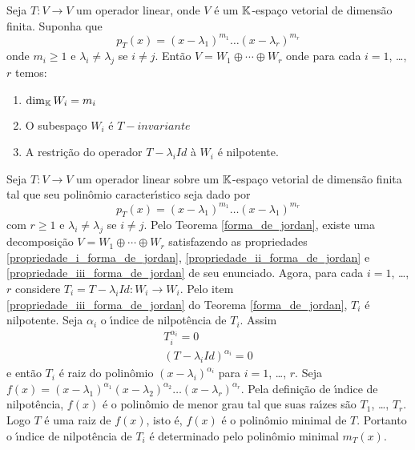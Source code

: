 \begin{teorema}\label{forma_de_jordan}
    Seja $T : V \to V$ um operador linear, onde $V$ \'e um $\mathbb{K}$-espa\c{c}o vetorial de dimens\~ao finita. Suponha que
    \[
        p_T(x) = (x - \lambda_1)^{m_1}\dots(x - \lambda_r)^{m_r}
    \]
    onde $m_i \ge 1$ e $\lambda_i \ne \lambda_j$ se $i \ne j$. Ent\~ao $V = W_1 \oplus \cdots \oplus W_r$ onde para cada $i = 1$, \dots, $r$ temos:
    \begin{enumerate}[label=({\roman*})]
        \item\label{propriedade_i_forma_de_jordan} $\dim_{\mathbb{K}} W_i = m_i$
        \item\label{propriedade_ii_forma_de_jordan} O subespa\c{c}o $W_i$ \'e $T-invariante$
        \item\label{propriedade_iii_forma_de_jordan} A restri\c{c}\~ao do operador $T - \lambda_i Id$ \`a $W_i$ \'e nilpotente.
    \end{enumerate}
\end{teorema}

Seja $T : V \to V$ um operador linear sobre um $\mathbb{K}$-espa\c{c}o vetorial de dimens\~ao finita tal que seu polin\^omio caracter{\'\i}stico seja dado por
\[
    p_T(x) = (x - \lambda_1)^{m_1}\dots(x - \lambda_1)^{m_r}
\]
com $r \ge 1$ e $\lambda_i \ne \lambda_j$ se $i \ne j$. Pelo Teorema \ref{forma_de_jordan}, existe uma decomposi\c{c}\~ao $V = W_1 \oplus \cdots \oplus W_r$ satisfazendo as propriedades \ref{propriedade_i_forma_de_jordan}, \ref{propriedade_ii_forma_de_jordan} e \ref{propriedade_iii_forma_de_jordan} de seu enunciado. Agora, para cada $i = 1$, \dots, $r$ considere $T_i = T - \lambda_i Id : W_i \to W_i$. Pelo item \ref{propriedade_iii_forma_de_jordan} do Teorema \ref{forma_de_jordan}, $T_i$ \'e nilpotente. Seja $\alpha_i$ o {\'\i}ndice de nilpot\^encia de $T_i$. Assim
\begin{align*}
    T_i^{\alpha_i} = 0\\
    (T - \lambda_i Id)^{\alpha_i} = 0
\end{align*}
e ent\~ao $T_i$ \'e raiz do polin\^omio $(x - \lambda_i)^{\alpha_i}$ para $i = 1$, \dots, $r$. Seja $f(x) = (x - \lambda_1)^{\alpha_1} (x - \lambda_2)^{\alpha_2}\dots (x - \lambda_r)^{\alpha_r}$. Pela defini\c{c}\~ao de {\'\i}ndice de nilpot\^encia, $f(x)$ \'e o polin\^omio de menor grau tal que suas ra{\'\i}zes s\~ao $T_1$, \dots, $T_r$. Logo $T$ \'e uma raiz de $f(x)$, isto \'e, $f(x)$ \'e o polin\^omio minimal de $T$. Portanto o {\'\i}ndice de nilpot\^encia de $T_i$ \'e determinado pelo polin\^omio minimal $m_T(x)$.

